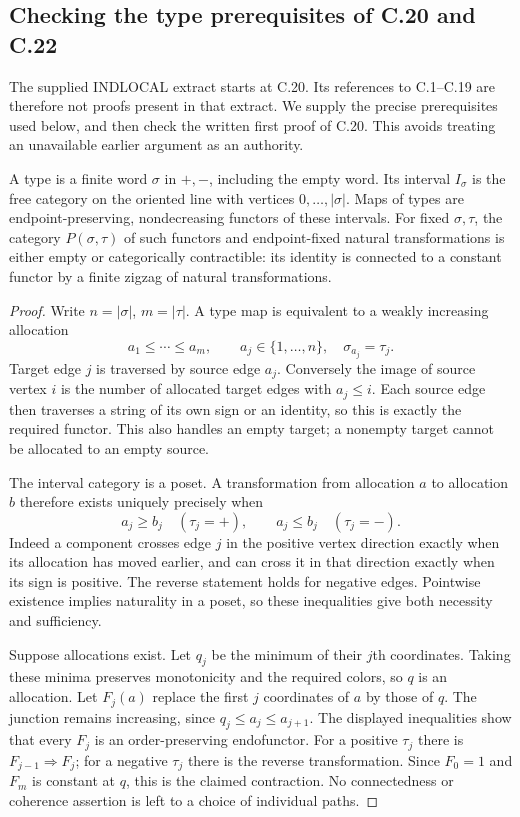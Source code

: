 \subsection{Checking the type prerequisites of C.20 and C.22}
The supplied \textsc{INDLOCAL} extract starts at C.20. Its references to
C.1--C.19 are therefore not proofs present in that extract. We supply
the precise prerequisites used below, and then check the written first
proof of C.20. This avoids treating an unavailable earlier argument as
an authority.

\begin{lemma}\label{F:type-contraction}
A type is a finite word $\sigma$ in $+,-$, including the empty word.
Its interval $I_\sigma$ is the free category on the oriented line with
vertices $0,\ldots,|\sigma|$. Maps of types are endpoint-preserving,
nondecreasing functors of these intervals. For fixed $\sigma,\tau$, the
category $P(\sigma,\tau)$ of such functors and endpoint-fixed natural
transformations is either empty or categorically contractible: its
identity is connected to a constant functor by a finite zigzag of
natural transformations.
\end{lemma}
\begin{proof}
Write $n=|\sigma|$, $m=|\tau|$. A type map is equivalent to a weakly
increasing allocation
\[
 a_1\leq\cdots\leq a_m,\qquad
 a_j\in\{1,\ldots,n\},\quad \sigma_{a_j}=\tau_j.
\]
Target edge $j$ is traversed by source edge $a_j$. Conversely the image
of source vertex $i$ is the number of allocated target edges with
$a_j\leq i$. Each source edge then traverses a string of its own sign
or an identity, so this is exactly the required functor. This also
handles an empty target; a nonempty target cannot be allocated to an
empty source.

The interval category is a poset. A transformation from allocation
$a$ to allocation $b$ therefore exists uniquely precisely when
\[
 a_j\geq b_j\quad(\tau_j=+),\qquad
 a_j\leq b_j\quad(\tau_j=-).
\]
Indeed a component crosses edge $j$ in the positive vertex direction
exactly when its allocation has moved earlier, and can cross it in that
direction exactly when its sign is positive. The reverse statement
holds for negative edges. Pointwise existence implies naturality in a
poset, so these inequalities give both necessity and sufficiency.

Suppose allocations exist. Let $q_j$ be the minimum of their $j$th
coordinates. Taking these minima preserves monotonicity and the required
colors, so $q$ is an allocation.
Let $F_j(a)$ replace the first $j$ coordinates of $a$ by those of $q$.
The junction remains increasing, since $q_j\leq a_j\leq a_{j+1}$.
The displayed inequalities show that every $F_j$ is an order-preserving
endofunctor. For a positive $\tau_j$ there is
$F_{j-1}\Rightarrow F_j$; for a negative $\tau_j$ there is the reverse
transformation. Since $F_0=1$ and $F_m$ is constant at $q$, this is the
claimed contraction. No connectedness or coherence assertion is left
to a choice of individual paths.
\end{proof}

